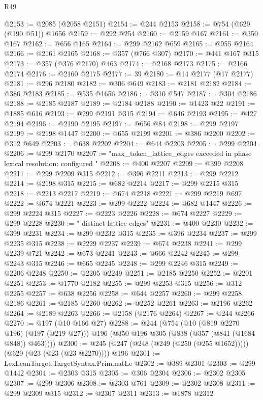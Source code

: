 \begin{lexlean}{R49}
\begin{coremodule}
@2153 := @2085 (@2058 @2151)
@2154 := @244 @2153
@2158 := @754 (@629 (@190 @51)) @1656
@2159 := @292 @254
@2160 := @2159 @167
@2161 := @350 @167
@2162 := @656 @165
@2164 := @299 @2162 @659
@2165 := @955 @2164
@2166 := @2161 @2165
@2168 := @357 (@766 @307)
@2170 := @441 @167 @315
@2173 := @357 (@376 @2170) @463
@2174 := @2168 @2173
@2175 := @2166 @2174
@2176 := @2160 @2175
@2177 := 39
@2180 := @14 @2177 (@17 @2177)
@2181 := @296 @2180
@2182 := @306 @649
@2183 := @2181 @2182
@2184 := @386 @2183
@2185 := @535 @1656
@2186 := @310 @547
@2187 := @304 @2186
@2188 := @2185 @2187
@2189 := @2184 @2188
@2190 := @1423 @22
@2191 := @1885 @616
@2193 := @299 @2191 @315
@2194 := @646 @2193
@2195 := @427 @2194
@2196 := @2190 @2195
@2197 := @656 @84
@2198 := @299 @2197
@2199 := @2198 @1447
@2200 := @655 @2199
@2201 := @386 @2200
@2202 := @312 @649
@2203 := @638 @2202
@2204 := @644 @2203
@2205 := @299 @2204
@2206 := @299 @2170
@2207 := "max_token_lattice_edges exceeded in phase lexical resolution: configured "
@2208 := @400 @2207
@2209 := @399 @2208
@2211 := @299 @2209 @315
@2212 := @396 @2211
@2213 := @299 @2212
@2214 := @2198 @315
@2215 := @682 @2214
@2217 := @299 @2215 @315
@2218 := @2213 @2217
@2219 := @674 @2218
@2221 := @299 @2219 @697
@2222 := @674 @2221
@2223 := @299 @2222
@2224 := @682 @1447
@2226 := @299 @2224 @315
@2227 := @2223 @2226
@2228 := @674 @2227
@2229 := @299 @2228
@2230 := " distinct lattice edges"
@2231 := @400 @2230
@2232 := @399 @2231
@2234 := @299 @2232 @315
@2235 := @396 @2234
@2237 := @299 @2235 @315
@2238 := @2229 @2237
@2239 := @674 @2238
@2241 := @299 @2239 @721
@2242 := @673 @2241
@2243 := @666 @2242
@2245 := @299 @2243 @315
@2246 := @665 @2245
@2248 := @299 @2246 @315
@2249 := @2206 @2248
@2250 := @2205 @2249
@2251 := @2185 @2250
@2252 := @2201 @2251
@2253 := @1770 @2182
@2255 := @299 @2253 @315
@2256 := @312 @2255
@2257 := @638 @2256
@2258 := @644 @2257
@2260 := @299 @2258 @2186
@2261 := @2185 @2260
@2262 := @2252 @2261
@2263 := @2196 @2262
@2264 := @2189 @2263
@2266 := @2158 (@2176 @2264)
@2267 := @244 @2266
@2270 := @197 (@10 @166 @27)
@2288 := @244
    (@754
      (@10 (@819 @2270 @196) (@197 (@219 @27)))
      @196
      (@350 @196 @305 (@838 (@357 (@841 (@1684 @848)) @463))))
@2300 := @245 (@247 (@248 (@249 (@250 (@255 @1652))))) (@629 (@23 (@23 (@23 @2270)))) @196
@2301 := LexLeanTarget.TargetSyntax.Prim.natLe
@2302 := @389 @2301
@2303 := @299 @1442
@2304 := @2303 @315
@2305 := @306 @2304
@2306 := @2302 @2305
@2307 := @299 @2306
@2308 := @2303 @761
@2309 := @2302 @2308
@2311 := @299 @2309 @315
@2312 := @2307 @2311
@2313 := @1878 @2312

\end{coremodule}
\end{lexlean}
